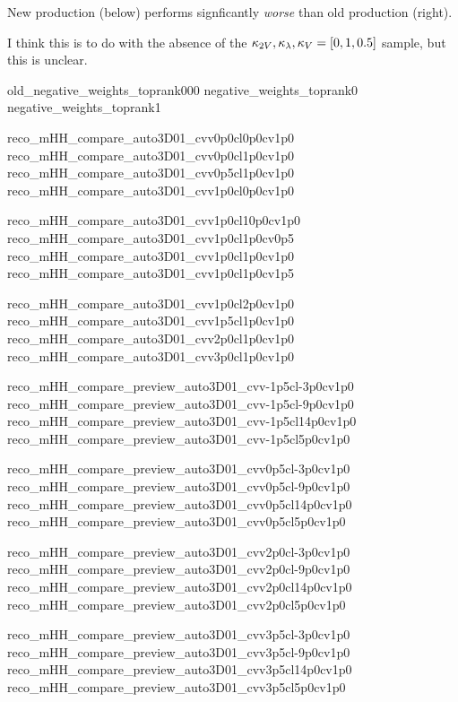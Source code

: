 
{ \tiny
    New production (below) performs signficantly \textit{worse} than old production (right).
    \vspace{3mm}

    I think this is to do with the absence of the $\kappa_{2V},\kappa_{\lambda},\kappa_{V} = [0, 1, 0.5]$ sample, but this is unclear.
}
{old_negative_weights_toprank000}
{negative_weights_toprank0}
{negative_weights_toprank1}

{reco_mHH_compare_auto3D01_cvv0p0cl0p0cv1p0}
{reco_mHH_compare_auto3D01_cvv0p0cl1p0cv1p0}
{reco_mHH_compare_auto3D01_cvv0p5cl1p0cv1p0}
{reco_mHH_compare_auto3D01_cvv1p0cl0p0cv1p0}

{reco_mHH_compare_auto3D01_cvv1p0cl10p0cv1p0}
{reco_mHH_compare_auto3D01_cvv1p0cl1p0cv0p5}
{reco_mHH_compare_auto3D01_cvv1p0cl1p0cv1p0}
{reco_mHH_compare_auto3D01_cvv1p0cl1p0cv1p5}

{reco_mHH_compare_auto3D01_cvv1p0cl2p0cv1p0}
{reco_mHH_compare_auto3D01_cvv1p5cl1p0cv1p0}
{reco_mHH_compare_auto3D01_cvv2p0cl1p0cv1p0}
{reco_mHH_compare_auto3D01_cvv3p0cl1p0cv1p0}



{reco_mHH_compare_preview_auto3D01_cvv-1p5cl-3p0cv1p0}
{reco_mHH_compare_preview_auto3D01_cvv-1p5cl-9p0cv1p0}
{reco_mHH_compare_preview_auto3D01_cvv-1p5cl14p0cv1p0}
{reco_mHH_compare_preview_auto3D01_cvv-1p5cl5p0cv1p0}

{reco_mHH_compare_preview_auto3D01_cvv0p5cl-3p0cv1p0}
{reco_mHH_compare_preview_auto3D01_cvv0p5cl-9p0cv1p0}
{reco_mHH_compare_preview_auto3D01_cvv0p5cl14p0cv1p0}
{reco_mHH_compare_preview_auto3D01_cvv0p5cl5p0cv1p0}

{reco_mHH_compare_preview_auto3D01_cvv2p0cl-3p0cv1p0}
{reco_mHH_compare_preview_auto3D01_cvv2p0cl-9p0cv1p0}
{reco_mHH_compare_preview_auto3D01_cvv2p0cl14p0cv1p0}
{reco_mHH_compare_preview_auto3D01_cvv2p0cl5p0cv1p0}

{reco_mHH_compare_preview_auto3D01_cvv3p5cl-3p0cv1p0}
{reco_mHH_compare_preview_auto3D01_cvv3p5cl-9p0cv1p0}
{reco_mHH_compare_preview_auto3D01_cvv3p5cl14p0cv1p0}
{reco_mHH_compare_preview_auto3D01_cvv3p5cl5p0cv1p0}
